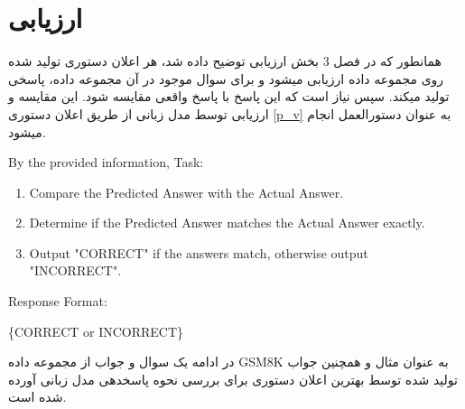 








\section*{ارزیابی}

همانطور که در فصل 3 بخش ارزیابی توضیح داده شد، هر اعلان دستوری تولید شده روی مجموعه داده ارزیابی می\/شود و برای سوال موجود در آن مجموعه داده، پاسخی تولید می\/کند. سپس نیاز است که این پاسخ با پاسخ واقعی مقایسه شود. این مقایسه و ارزیابی توسط مدل زبانی از طریق اعلان دستوری \ref{p_v} به عنوان دستورالعمل انجام می\/شود.

\begin{tcolorbox}[breakable,colframe=mybluecolor!100, colback=mybluecolor!20, title=اعلان دستوری برای ارزیابی جواب تولید شده] \label{p_v}
	\begin{LTR}
	By the provided information,  
	Task:  
	\begin{enumerate}
		\item Compare the Predicted Answer with the Actual Answer.
		\item Determine if the Predicted Answer matches the Actual Answer exactly.
		\item Output "CORRECT" if the answers match, otherwise output "INCORRECT".
	\end{enumerate}
	
	Response Format:  
	
	\{CORRECT or INCORRECT\} 
	\end{LTR} 
\end{tcolorbox}

در ادامه یک سوال و جواب از مجموعه داده GSM8K به عنوان مثال و همچنین جواب تولید شده توسط بهترین اعلان دستوری برای بررسی نحوه پاسخدهی مدل زبانی آورده شده است.

